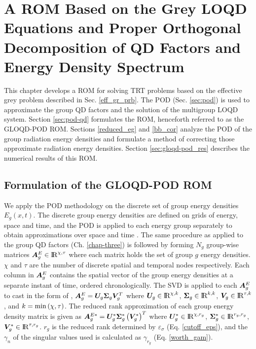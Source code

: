 \chapter{A ROM Based on the Grey LOQD Equations and Proper Orthogonal Decomposition of QD Factors and Energy Density Spectrum}
\label{chap-four}

\newcommand{\amodkapebin}{\kapebin^{\tau*}}
\newcommand{\amodkaprbirn}{\kaprbirn^{\tau*}}
\newcommand{\amodkapgirn}{\kapgirn^{\tau*}}
\newcommand{\amodkapgirrn}{\kapgirrn^{\tau*}}

\newcommand{\aetailnp}{\eta_{i-\frac{1}{2},n}^{+*}}
\newcommand{\aetailnm}{\eta_{i-\frac{1}{2},n}^{-*}}
\newcommand{\aetairnp}{\eta_{i+\frac{1}{2},n}^{+*}}
\newcommand{\aetairnm}{\eta_{i+\frac{1}{2},n}^{-*}}

This chapter develops a ROM for solving TRT problems based on the effective grey problem described in Sec. \ref{eff_gr_prb}. The POD (Sec. \ref{sec:pod}) is used to approximate the group QD factors and the solution of the multigroup LOQD system. Section \ref{sec:pod-qd} formulates the ROM, henceforth referred to as the GLOQD-POD ROM. Sections \ref{reduced_eg} and \ref{bb_cor} analyze the POD of the group radiation energy densities and formulate a method of correcting those approximate radiation energy densities. Section \ref{sec:gloqd-pod_res} describes the numerical results of this ROM.

\section{Formulation of the GLOQD-POD ROM} \label{sec:pod-gqd} 
	We apply the POD methodology on the discrete set of group energy densities $E_g(x,t)$. The discrete group energy densities are defined on grids of energy, space and time, and the POD is applied to each energy group separately to obtain approximations over space and time \cite{dya-jcp-2019}. The same procedure as applied to the group QD factors (Ch. \ref{chap-three}) is followed by forming $N_g$ group-wise matrices $\bm{A}^{E}_g \in {\rm I\!R}^{\chi,\tau}$ where each matrix holds the set of group $g$ energy densities. $\chi$ and $\tau$ are the number of discrete spatial and temporal nodes respectively. Each column in $\bm{A}^E_g$ contains the spatial vector of the group energy densities at a separate instant of time, ordered chronologically. The SVD  is applied to each $\bm{A}^E_g$ to cast in the form of , $\bm{A}^E_g = \bm{U}_g\bm{\Sigma}_g\bm{V}_g^T$ where $\bm{U}_g \in {\rm I\!R}^{\chi,k}$, $\bm{\Sigma}_g \in {\rm I\!R}^{k,k}$, $\bm{V}_g \in {\rm I\!R}^{\tau,k}$, and $k = \min\left(\chi,\tau\right)$. The reduced rank approximation of each group energy density matrix is given as $\bm{A}^{E*}_g  = \bm{U}^*_g\bm{\Sigma}^*_g\left(\bm{V}^{*}_g\right)^T $ where $\bm{U}^*_g \in {\rm I\!R}^{\chi,r_g}$, $\bm{\Sigma}^*_g \in {\rm I\!R}^{r_g,r_g}$, $\bm{V}^{*}_g \in {\rm I\!R}^{\tau,r_g}$. $r_g$ is the reduced rank determined by $\varepsilon_\sigma$ (Eq. \ref{cutoff_eps}), and the $\gamma_n$ of the singular values used is calculated as $\gamma_{r_g}$ (Eq. \ref{worth_gam}).
	
